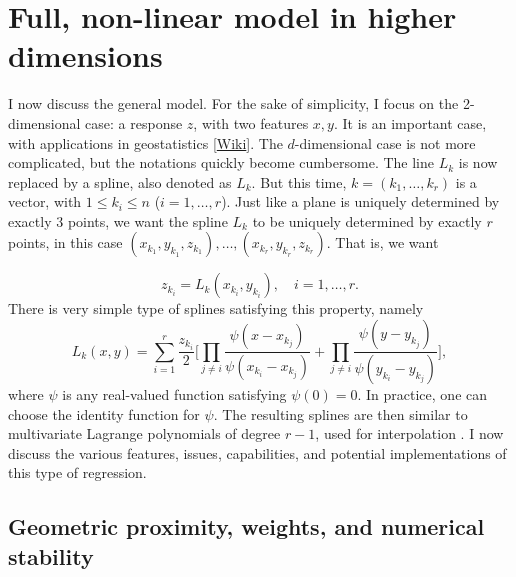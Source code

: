 \documentclass[oneside,10pt]{book}
\begin{document}
\section{Full, non-linear model in higher dimensions}\label{fuzq1}

I now discuss the general model. For the sake of simplicity, I focus on the 2-dimensional case: a response $z$, with two features $x, y$. It is an important case, with applications
in \textcolor{index}{geostatistics} [\href{https://en.wikipedia.org/wiki/Geostatistics}{Wiki}]. The $d$-dimensional case is not more complicated, but the notations quickly become cumbersome.
The line $L_k$ is now replaced by a spline, also denoted as $L_k$. But this time,
$k=(k_1,\dots,k_r)$ is a vector, with $1\leq k_i \leq n$ ($i=1,\dots,r$). Just like a plane is uniquely determined by exactly 3 points, we want the spline $L_k$ to be uniquely determined by
exactly $r$ points, in this case $(x_{k_1},y_{k_1},z_{k_1}),\dots,(x_{k_r},y_{k_r},z_{k_r})$. That is, we want

$$
z_{k_i} = L_k(x_{k_i}, y_{k_i}), \quad i=1,\dots,r.
$$
There is very simple type of splines satisfying this property, namely
\begin{equation}
L_k(x,y)=\sum_{i=1}^r \frac{z_{k_i}}{2} \Bigg[\prod_{ j\neq i} \frac{\psi(x-x_{k_j})}{\psi(x_{k_i}-x_{k_j})} + \prod_{ j\neq i} \frac{\psi(y-y_{k_j})}{\psi(y_{k_i}-y_{k_j})}\Bigg],
\label{feqzz}
\end{equation}
where $\psi$ is any real-valued function satisfying $\psi(0)=0$. In practice, one can choose the identity function for $\psi$. The resulting splines are then similar to
multivariate Lagrange polynomials of degree $r-1$, used for interpolation \cite{siam1}. I now discuss the various features, issues, capabilities, and potential implementations of this type of regression.

\subsection{Geometric proximity, weights, and numerical stability}\label{fuzq2}
\end{document}
